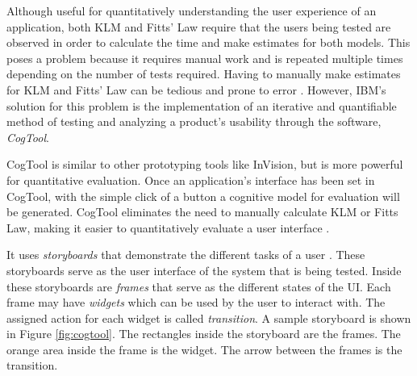         
        Although useful for quantitatively understanding the user experience of an application, both KLM and Fitts' Law require that the users being tested are observed in order to calculate the time and make estimates for both models. This poses a problem because it requires manual work and is repeated multiple times depending on the number of tests required. Having to manually make estimates for KLM and Fitts' Law can be tedious and prone to error \citep{sauro2009estimating}. However, IBM's solution for this problem is the implementation of an iterative and quantifiable method of testing and analyzing a product's usability through the software, \textit{CogTool}. 
         
         CogTool is similar to other prototyping tools like InVision, but is more powerful for quantitative evaluation. Once an application's interface has been set in CogTool, with the simple click of a button a cognitive model for evaluation will be generated. CogTool eliminates the need to manually calculate KLM or Fitts Law, making it easier to quantitatively evaluate a user interface \citep{bellamy2011deploying}. 
         
		It uses \textit{storyboards} that demonstrate the different tasks of a user \citep{bellamy2011deploying}. These storyboards serve as the user interface of the system that is being tested. Inside these storyboards are \textit{frames} that serve as the different states of the UI. Each frame may have \textit{widgets} which can be used by the user to interact with. The assigned action for each widget is called \textit{transition}. A sample storyboard is shown in Figure \ref{fig:cogtool}. The rectangles inside the storyboard are the frames. The orange area inside the frame is the widget. The arrow between the frames is the transition.
        
        
